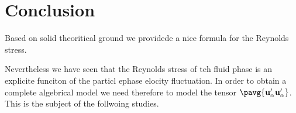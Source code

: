 \section{Conclusion}

Based on solid theoritical ground we providede a nice formula for the Reynolds stress. 



Nevertheless we have seen that the Reynolds stress of teh fluid phase is an explicite funciton of the particl ephase elocity fluctuation. 
In order to obtain a complete algebrical model we need therefore to model the tensor $\pavg{\textbf{u}_\alpha'\textbf{u}_\alpha'}$. 
This is the subject of the follwoing studies. 